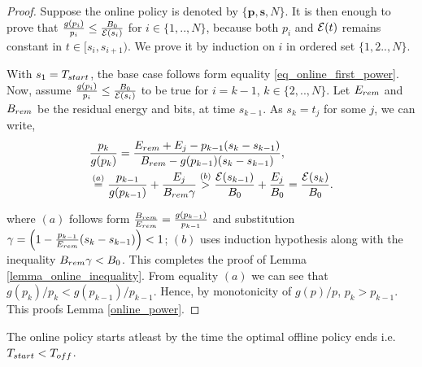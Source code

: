\begin{proof}
Suppose the online policy is denoted by $\{\bm{p},\bm{s},N\}$. It is then enough to prove that $\frac{g(p_i)}{p_i} \le \frac{B_0}{\mathcal{E}(s_i)}$ for $i\in\{1,..,N\} $, because both $p_i$ and $\mathcal{E}(t)$ remains constant in $t\in[s_i,s_{i+1})$. We prove it by induction on $i$ in ordered set $\{1,2..,N\}$. 

With $s_1=T_{\mbox{\scriptsize{start}}}$, the base case follows form equality \eqref{eq_online_first_power}. Now, assume $\frac{g(p_i)}{p_i}\le \frac{B_0}{\mathcal{E}(s_i)}$ to be true for $i=k-1$, $k\in \{2,..,N\}$. Let $E_{\mbox{\scriptsize{rem}}}$ and $B_{\mbox{\scriptsize{rem}}}$ be the residual energy and bits, at time $s_{k-1}$. As $s_k=t_j$ for some $j$, we can write,
\begin{align*}
&\frac{p_{k}}{g(p_{k})}=\frac{E_{\mbox{\scriptsize{rem}}}+E_{j}-p_{k-1} (s_k-s_{k-1})}{B_{\mbox{\scriptsize{rem}}}-g(p_{k-1}) (s_k-s_{k-1})},
\\
&\stackrel{(a)}{=}\frac{p_{k-1}}{g(p_{k-1})}+\frac{E_{j}}{B_{\mbox{\scriptsize{rem}}}\gamma}
\stackrel{(b)}{>}\frac{\ETx(s_{k-1})}{B_0}+\frac{E_{j}}{B_0}=\frac{{\ETx(s_{k})}}{B_0}.
\end{align*}

where $(a)$ follows form $\frac{B_{\mbox{\scriptsize{rem}}}}{E_{\mbox{\scriptsize{rem}}}}=\frac{g(p_{k-1})}{p_{k-1}}$ and substitution $\gamma=\left( 1-\frac{p_{k-1}}{E_{\mbox{\scriptsize{rem}}}} (s_k-s_{k-1})\right)< 1$;  $(b)$ uses induction hypothesis along with the inequality $B_{\mbox{\scriptsize{rem}}}\gamma< B_0$. This completes the proof of Lemma \ref{lemma_online_inequality}. From equality $(a)$ we can see that $g(p_k)/p_k<g(p_{k-1})/p_{k-1}$. Hence, by monotonicity of $g(p)/p$, $p_{k}>p_{k-1}$. This proofs Lemma \ref{online_power}.
\end{proof}



\begin{lemma}
The online policy starts atleast by the time the optimal offline policy ends i.e. $T_{\mbox{\scriptsize{start}}} <T_{\mbox{\scriptsize{off}}}$.
\label{onilne_time}
\end{lemma}


